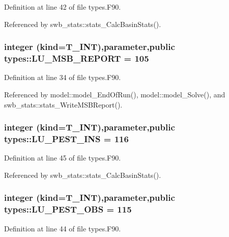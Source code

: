 Definition at line 42 of file types.F90.



Referenced by swb\_\-stats::stats\_\-CalcBasinStats().

\hypertarget{namespacetypes_aa997f1b516b3fe69d84925827bb1f85f}{
\subsubsection[{LU\_\-MSB\_\-REPORT}]{\setlength{\rightskip}{0pt plus 5cm}integer (kind={\bf T\_\-INT}),parameter,public {\bf types::LU\_\-MSB\_\-REPORT} = 105}}
\label{namespacetypes_aa997f1b516b3fe69d84925827bb1f85f}


Definition at line 34 of file types.F90.



Referenced by model::model\_\-EndOfRun(), model::model\_\-Solve(), and swb\_\-stats::stats\_\-WriteMSBReport().

\hypertarget{namespacetypes_a8897682c60c1fbc7595e60937266dfc3}{
\subsubsection[{LU\_\-PEST\_\-INS}]{\setlength{\rightskip}{0pt plus 5cm}integer (kind={\bf T\_\-INT}),parameter,public {\bf types::LU\_\-PEST\_\-INS} = 116}}
\label{namespacetypes_a8897682c60c1fbc7595e60937266dfc3}


Definition at line 45 of file types.F90.



Referenced by swb\_\-stats::stats\_\-CalcBasinStats().

\hypertarget{namespacetypes_afb3d31ed372313e730716e33e42c735a}{
\subsubsection[{LU\_\-PEST\_\-OBS}]{\setlength{\rightskip}{0pt plus 5cm}integer (kind={\bf T\_\-INT}),parameter,public {\bf types::LU\_\-PEST\_\-OBS} = 115}}
\label{namespacetypes_afb3d31ed372313e730716e33e42c735a}


Definition at line 44 of file types.F90.



